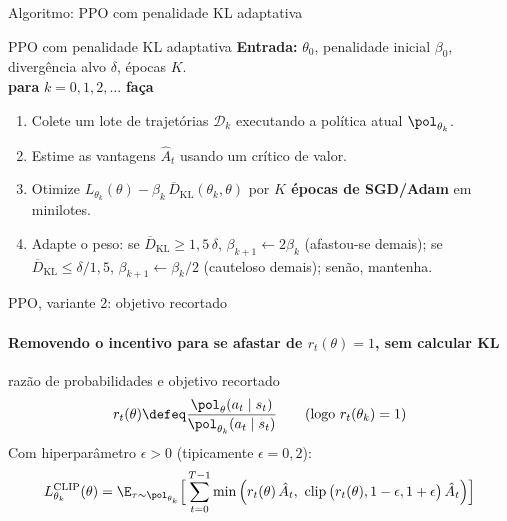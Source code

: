 \documentclass[aspectratio=169, 11pt]{beamer}
\newcommand{\Ahat}{\hat{A}}
\newcommand{\KLbar}{\overline{D}_{\mathrm{KL}}}
\DeclareMathOperator{\clipop}{clip}
\begin{document}
\begin{frame}{Algoritmo: PPO com penalidade KL adaptativa}
  \begin{algbox}{PPO com penalidade KL adaptativa}
    \small
    \textbf{Entrada:} $\theta_0$, penalidade inicial $\beta_0$, divergência alvo $\delta$, épocas $K$.\\
    \textbf{para} $k = 0, 1, 2, \dots$ \textbf{faça}
    \begin{enumerate}\setlength{\itemsep}{0pt}
      \item Colete um lote de trajetórias $\mathcal{D}_k$ executando a política atual $\pol_{\theta_k}$.
      \item Estime as vantagens $\Ahat_t$ usando um crítico de valor.
      \item Otimize $L_{\theta_k}(\theta) - \beta_k\,\KLbar(\theta_k,\theta)$ por \textbf{$K$ épocas de SGD/Adam} em minilotes.
      \item Adapte o peso: se $\KLbar\ge 1{,}5\,\delta$, $\beta_{k+1}\leftarrow 2\beta_k$ (afastou-se demais);
            se $\KLbar\le\delta/1{,}5$, $\beta_{k+1}\leftarrow\beta_k/2$ (cauteloso demais); senão, mantenha.
    \end{enumerate}
  \end{algbox}
\end{frame}

\begin{frame}{PPO, variante 2: objetivo recortado}
  \framesubtitle{Removendo o incentivo para se afastar de $r_t(\theta) = 1$, sem calcular KL}

  \begin{defbox}{razão de probabilidades e objetivo recortado}
    \[
      r_t(\theta) \defeq \frac{\pol_\theta(a_t\mid s_t)}{\pol_{\theta_k}(a_t\mid s_t)}\qquad(\text{logo } r_t(\theta_k) = 1)
    \]
    Com hiperparâmetro $\epsilon>0$ (tipicamente $\epsilon = 0{,}2$):
    \[
      L^{\mathrm{CLIP}}_{\theta_k}(\theta) = \E_{\tau\sim\pol_{\theta_k}}\Big[\sum_{t=0}^{T-1}
        \min\Big(r_t(\theta)\,\Ahat_t,\ \clipop\big(r_t(\theta),1-\epsilon,1+\epsilon\big)\,\Ahat_t\Big)\Big]
    \]
  \end{defbox}
\end{frame}
\end{document}

